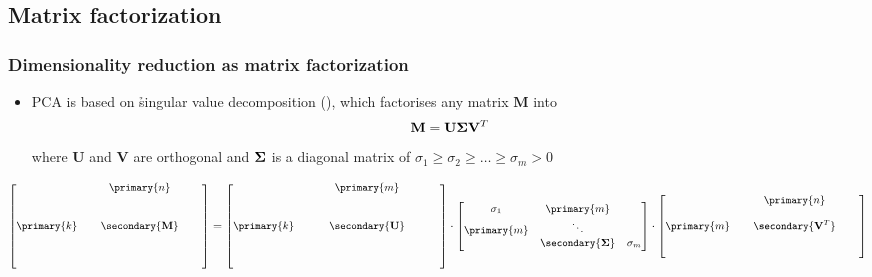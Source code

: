 \documentclass[t]{beamer} %
\begin{document}
\subsection{Matrix factorization}

\begin{frame}
  \frametitle{Dimensionality reduction as matrix factorization}

    \begin{itemize}
  \item PCA is based on \h{singular value decomposition} (), which factorises any matrix $\mathbf{M}$ into
    \[
    \mathbf{M} = \mathbf{U} \boldsymbol{\Sigma} \mathbf{V}^T
    \]
    where $\mathbf{U}$ and $\mathbf{V}$ are orthogonal and $\boldsymbol{\Sigma}$ is a diagonal matrix of
     $\sigma_1\geq \sigma_2\geq \dots \geq \sigma_m > 0$
  \end{itemize}

  \begin{equation*}\small
    \begin{bmatrix}
      & & \primary{n} & & \\
      & & & & \\
      & & & & \\
      \primary{k} & & \secondary{\mathbf{M}} & & \\
      & & & & \\
      & & & & \\
      & & & & 
    \end{bmatrix}
    =
    \begin{bmatrix}
      & & & \primary{m} & & & \\
      & & & & & & \\
      & & & & & & \\
      \primary{k} & & & \secondary{\mathbf{U}} & & & \\
      & & & & & & \\
      & & & & & & \\
      & & & & & &
    \end{bmatrix}
    \cdot
    \begin{bmatrix}
      \sigma_1 & \primary{m} & \\
      \primary{m} & \ddots & \\
      & \secondary{\Msigma} & \sigma_m
    \end{bmatrix}
    \cdot
    \begin{bmatrix}
      & & \primary{n} & & \\
      & & & & \\
      \primary{m} & & \secondary{\mathbf{V}^T} & & \\
      & & & & \\
      & & & &
    \end{bmatrix}
  \end{equation*}
\end{frame}
\end{document}
